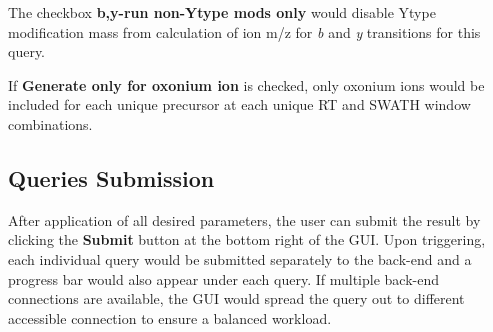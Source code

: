 \documentclass[../manual.tex]{subfiles}
\begin{document}
The checkbox \textbf{b,y-run non-Ytype mods only} would disable Ytype modification mass from calculation of ion m/z for \emph{b} and \emph{y} transitions for this query.\par

If \textbf{Generate only for oxonium ion} is checked, only oxonium ions would be included for each unique precursor at each unique RT and SWATH window combinations.\par

\subsection{Queries Submission}
After application of all desired parameters, the user can submit the result by clicking the \textbf{Submit} button at the bottom right of the GUI. Upon triggering, each individual query would be submitted separately to the back-end and a progress bar would also appear under each query. If multiple back-end connections are available, the GUI would spread the query out to different accessible connection to ensure a balanced workload.
\end{document}
